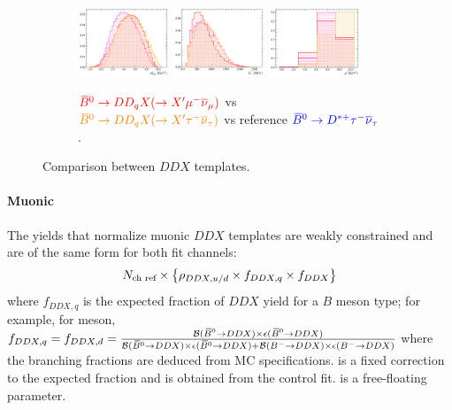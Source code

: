 \begin{figure}[!htb]
    \begin{subfigure}{\textwidth}
        \centering
        \includegraphics[width=0.3\textwidth]{figs-fit-fit-templates/histo-comp/Dst_iso_DstTau__vs__Dst_iso_dDDMu__vs__D0_iso_dDDTau__m2miss.pdf}
        \includegraphics[width=0.3\textwidth]{figs-fit-fit-templates/histo-comp/Dst_iso_DstTau__vs__Dst_iso_dDDMu__vs__D0_iso_dDDTau__el.pdf}
        \includegraphics[width=0.3\textwidth]{figs-fit-fit-templates/histo-comp/Dst_iso_DstTau__vs__Dst_iso_dDDMu__vs__D0_iso_dDDTau__q2.pdf}
        \caption{
            $\textcolor{red}{{{\kern 0.18em\overline{\kern -0.18em B}}{}^0} \rightarrow D D_q X (\rightarrow X'{\mu^-}{{\overline{\nu}}_\mu})}$
            vs
            $\textcolor{orange}{{{\kern 0.18em\overline{\kern -0.18em B}}{}^0} \rightarrow D D_q X (\rightarrow X'{\tau^-}{{\overline{\nu}}_\tau})}$
            vs reference
            $\textcolor{blue}{{{\kern 0.18em\overline{\kern -0.18em B}}{}^0} \rightarrow {\ensuremath{{D}^{*+}}}{\ensuremath{\tau^-}}{\ensuremath{{\overline{\nu}}_\tau}}}$.
        }
    \end{subfigure}

    \caption{Comparison between $DDX$ templates.}
    \label{fig:ddx-templates}
\end{figure}

\paragraph{Muonic}
The yields that normalize muonic $DDX$ templates are weakly constrained and are
of the same form for both fit channels:
\begin{equation}
    N_\text{ch ref} \times \left\{
        \rho_{DDX,u/d} \times f_{DDX,q} \times f_{DDX}
    \right\}
\end{equation}
where $f_{DDX,q}$ is the expected fraction of $DDX$ yield for a $B$ meson type;
for example, for \Bzb meson,
$f_{DDX,q} = f_{DDX,d} =
\frac{\mathcal{B}({{\kern 0.18em\overline{\kern -0.18em B}}{}^0} \rightarrow DDX) \times \epsilon({{\kern 0.18em\overline{\kern -0.18em B}}{}^0} \rightarrow DDX)}{
\mathcal{B}({{\kern 0.18em\overline{\kern -0.18em B}}{}^0} \rightarrow DDX) \times \epsilon({{\kern 0.18em\overline{\kern -0.18em B}}{}^0} \rightarrow DDX) +
\mathcal{B}({{{B}^-}} \rightarrow DDX) \times \epsilon({{{B}^-}} \rightarrow DDX)
}$
where the branching fractions are deduced from MC specifications.
\fitDDXuvsd is a fixed correction to the expected fraction and is obtained from
the control fit.
\fitfDDX is a free-floating parameter.

